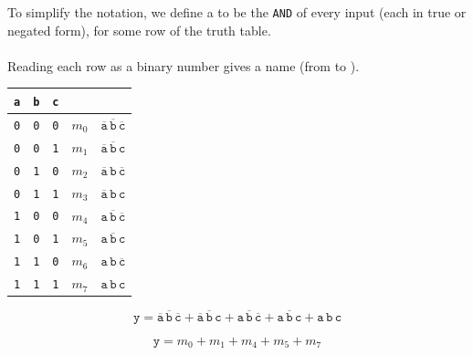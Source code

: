 \documentclass[mathserif, handout]{beamer}
\newcommand{\ttab}[1]{\texttt{#1}}
\begin{document}
\begin{frame}
To simplify the notation, we define a  to be the \texttt{AND} of every input (each in true or negated form), for some row of the truth table.
\\~\\
Reading each row as a binary number gives a name (from  to ).\\[2mm]
\begin{center}
    \renewcommand{\arraystretch}{1.1}
    {\small
    \begin{tabular}{ccc|cC}
      \ttab{a} & \ttab{b} & \ttab{c} &  &  \\ \hline
      \ttab{0} & \ttab{0} & \ttab{0} & $m_0$ & $\overline{\ttab{a}}\,\overline{\ttab{b}}\,\overline{\ttab{c}}$ \\
      \ttab{0} & \ttab{0} & \ttab{1} & $m_1$ & $\overline{\ttab{a}}\,\overline{\ttab{b}}\,\ttab{c}$ \\
      \ttab{0} & \ttab{1} & \ttab{0} & $m_2$ & $\overline{\ttab{a}}\,\ttab{b}\,\overline{\ttab{c}}$ \\
      \ttab{0} & \ttab{1} & \ttab{1} & $m_3$ & $\overline{\ttab{a}}\,\ttab{b}\,\ttab{c}$ \\
      \ttab{1} & \ttab{0} & \ttab{0} & $m_4$ & $\ttab{a}\,\overline{\ttab{b}}\,\overline{\ttab{c}}$ \\
      \ttab{1} & \ttab{0} & \ttab{1} & $m_5$ & $\ttab{a}\,\overline{\ttab{b}}\,\ttab{c}$ \\
      \ttab{1} & \ttab{1} & \ttab{0} & $m_6$ & $\ttab{a}\,\ttab{b}\,\overline{\ttab{c}}$ \\
      \ttab{1} & \ttab{1} & \ttab{1} & $m_7$ & $\ttab{a}\,\ttab{b}\,\ttab{c}$ \\
    \end{tabular}}
  \end{center}

\[
\ttab{y} = \overline{\ttab{a}}\,\overline{\ttab{b}}\,\overline{\ttab{c}} + \overline{\ttab{a}}\,\overline{\ttab{b}}\,\ttab{c} + \ttab{a}\,\overline{\ttab{b}}\,\overline{\ttab{c}} + \ttab{a}\,\overline{\ttab{b}}\,\ttab{c} + \ttab{a}\,\ttab{b}\,\ttab{c}
\]
\begin{center}\vspace{-2mm}
\vspace{-2mm}
\end{center}
\[
\ttab{y} = m_0 + m_1+m_4+m_5+m_7
\]
\end{frame}
\end{document}

